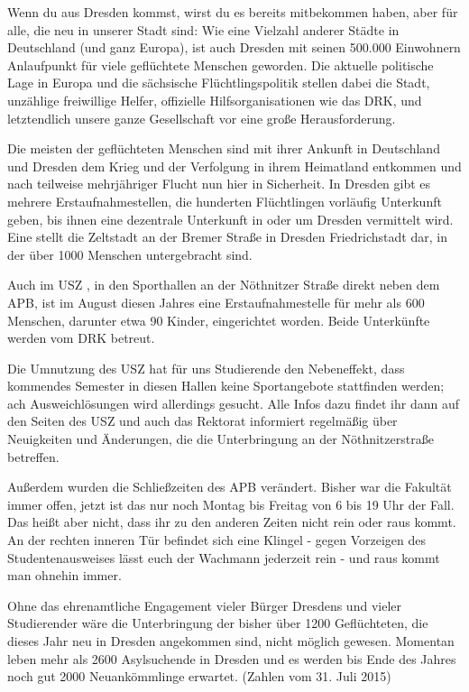 
Wenn du aus Dresden kommst, wirst du es bereits mitbekommen haben, aber für alle, die neu in unserer Stadt sind: Wie eine Vielzahl anderer Städte in Deutschland (und ganz Europa), ist auch Dresden mit seinen 500.000 Einwohnern Anlaufpunkt für viele geflüchtete Menschen geworden. Die aktuelle politische Lage in Europa und die sächsische Flüchtlingspolitik stellen dabei die Stadt, unzählige freiwillige Helfer, offizielle Hilfsorganisationen wie das DRK, und letztendlich unsere ganze Gesellschaft vor eine große Herausforderung. 

Die meisten der geflüchteten Menschen sind mit ihrer Ankunft in Deutschland und Dresden dem Krieg und der Verfolgung in ihrem Heimatland entkommen und nach teilweise mehrjähriger Flucht nun hier in Sicherheit. In Dresden gibt es mehrere Erstaufnahmestellen, die hunderten Flüchtlingen vorläufig Unterkunft geben, bis ihnen eine dezentrale Unterkunft in oder um Dresden vermittelt wird. Eine stellt die Zeltstadt an der Bremer Straße in Dresden Friedrichstadt dar, in der über 1000 Menschen untergebracht sind.

Auch im USZ , in den Sporthallen an der Nöthnitzer Straße direkt neben dem APB, ist im August diesen Jahres eine Erstaufnahmestelle für mehr als 600 Menschen, darunter etwa 90 Kinder, eingerichtet worden.   Beide Unterkünfte werden vom DRK betreut.

Die Umnutzung des USZ hat für uns Studierende den Nebeneffekt, dass kommendes Semester in diesen Hallen keine Sportangebote stattfinden werden; ach Ausweichlösungen wird allerdings gesucht. Alle Infos dazu findet ihr dann auf den Seiten des USZ und auch das Rektorat informiert regelmäßig über Neuigkeiten und Änderungen, die die Unterbringung an der Nöthnitzerstraße betreffen. 

Außerdem wurden die Schließzeiten des APB verändert. Bisher war die Fakultät immer offen, jetzt ist das nur noch Montag bis Freitag von 6 bis 19 Uhr der Fall. Das heißt aber nicht, dass ihr zu den anderen Zeiten nicht rein oder raus kommt. An der rechten inneren Tür befindet sich eine Klingel - gegen Vorzeigen des Studentenausweises lässt euch der Wachmann jederzeit rein - und raus kommt man ohnehin immer.

Ohne das ehrenamtliche Engagement vieler Bürger Dresdens und vieler Studierender wäre die Unterbringung der bisher über 1200 Geflüchteten, die dieses Jahr neu in Dresden angekommen sind, nicht möglich gewesen. Momentan leben mehr als 2600 Asylsuchende in Dresden und es werden bis Ende des Jahres noch gut 2000 Neuankömmlinge erwartet.  (Zahlen vom 31. Juli 2015) 

